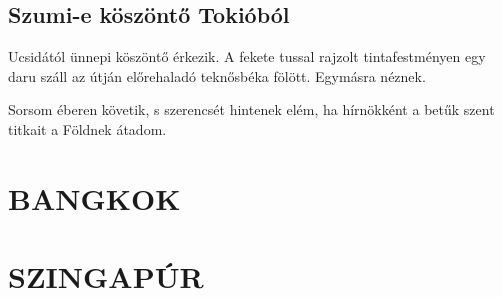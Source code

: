 \section{Szumi-e köszöntő Tokióból}

Ucsidától ünnepi köszöntő érkezik. A fekete tussal rajzolt tintafestményen
egy daru száll az útján előrehaladó teknősbéka fölött. Egymásra néznek.

Sorsom éberen követik, s szerencsét hintenek elém, ha hírnökként
a betűk szent titkait a Földnek átadom.

\chapter{BANGKOK}

\chapter{SZINGAPÚR}
